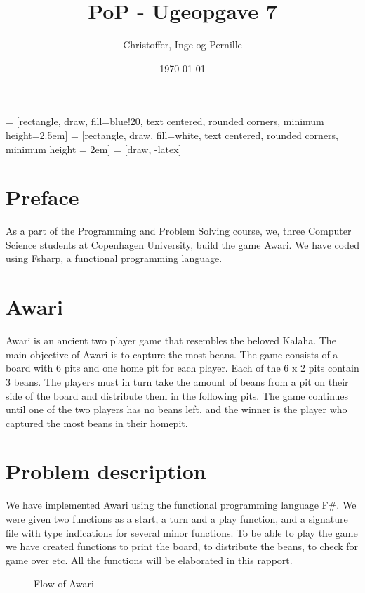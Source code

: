\documentclass[a4paper]{report}
\title{PoP - Ugeopgave 7}
\author{Christoffer, Inge og Pernille}
\date{\today}
\begin{document}
\maketitle
{} = [rectangle, draw, fill=blue!20, text centered,
    rounded corners, minimum height=2.5em]
 = [rectangle, draw, fill=white, text centered,
    rounded corners, minimum height = 2em]
 = [draw, -latex]

\section*{Preface}
As a part of the Programming and Problem Solving course, we,
three Computer Science students at Copenhagen University, build the game Awari. We have coded using Fsharp, a functional programming language.

\section*{Awari}
Awari is an ancient two player game that resembles the beloved Kalaha. The main
objective of Awari is to capture the most beans. The game consists of a board
with 6 pits and one home pit for each player. Each of the 6 x 2 pits contain
3 beans. The players must in turn take the amount of beans from a pit on their
side of the board and distribute them in the following pits. The game
continues until one of the two players has no beans left, and the winner is the
player who captured the most beans in their homepit.

\section*{Problem description}
We have implemented Awari using the functional programming language F\#. We
were given two functions as a start, a turn and a play function, and a signature
file with type indications for several minor functions. To be able to play the
game we have created functions to print the board, to distribute the beans, to
check for game over etc. All the functions will be elaborated in this rapport.

\begin{figure}
\centering
{}
\caption{Flow of Awari}
\label{fig:gameflow}
\end{figure}
\end{document}
